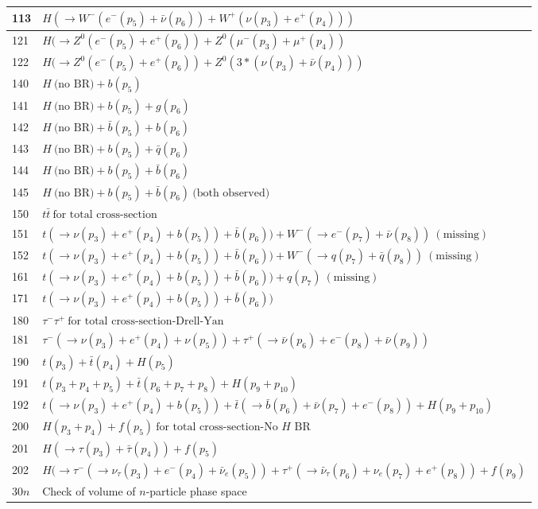\documentclass[12pt]{article}
\begin{document}
\begin{itemize}
\begin{table}
\begin{center}
\begin{tabular}{|l|l|}
113 & $ H(\to W^-(e^-(p_5)+\bar{\nu}(p_6))+W^+(\nu(p_3)+e^+(p_4))) $ \\ 
\hline
121 & $ H(\to Z^0(e^-(p_5)+e^+(p_6))+Z^0(\mu^-(p_3)+\mu^+(p_4)) $ \\ 
122 & $ H(\to Z^0(e^-(p_5)+e^+(p_6))+Z^0(3*(\nu(p_3)+\bar{\nu}(p_4))) $ \\ 
\hline
140 & $ H ~\mbox{(no BR)} + b(p_5)$ \\
141 & $ H ~\mbox{(no BR)} + b(p_5) +g(p_6)$ \\
142 & $ H ~\mbox{(no BR)} + {\bar b}(p_5) +b(p_6)$ \\
143 & $ H ~\mbox{(no BR)} + b(p_5) + {\bar q}(p_6)$ \\
144 & $ H ~\mbox{(no BR)} + b(p_5) + {\bar b}(p_6)$ \\
145 & $ H ~\mbox{(no BR)} + b(p_5) + {\bar b}(p_6) ~\mbox{(both observed)}$ \\
\hline
150 & $ t \bar{t} ~\mbox{for total cross-section} $ \\ 
151 & $ t(\to\nu(p_3)+e^+(p_4)+b(p_5))+\bar{b}(p_6))+W^-(\to e^-(p_7)+\bar{\nu}(p_8))~(\mathrm{missing}) $ \\ 
152 & $ t(\to\nu(p_3)+e^+(p_4)+b(p_5))+\bar{b}(p_6))+W^-(\to q(p_7)+{\bar q}(p_8))~(\mathrm{missing}) $ \\ 
\hline
161 & $ t(\to\nu(p_3)+e^+(p_4)+b(p_5))+\bar{b}(p_6))+q(p_7)~(\mathrm{missing}) $ \\ 
\hline
171 & $ t(\to \nu(p_3)+e^+(p_4)+b(p_5))+\bar{b}(p_6)) $ \\ 
\hline
180 & $ \tau^- \tau^+ ~\mbox{for total cross-section-Drell-Yan} $ \\ 
181 & $ \tau^-(\to \nu(p_3)+e^+(p_4)+\nu(p_5))+\tau^+(\to \bar{\nu}(p_6)+e^-(p_8)+\bar{\nu}(p_9)) $ \\  
\hline
190 & $ t(p_3) + {\bar t}(p_4) + H(p_5) $ \\ 
191 & $ t(p_3+p_4+p_5) + {\bar t}(p_6+p_7+p_8) + H(p_9+p_{10}) $ \\ 
192 & $ t(\to \nu(p_3)+e^+(p_4)+b(p_5)) +
{\bar t}(\to {\bar b}(p_6)+{\bar \nu}(p_7)+e^-(p_8)) + H(p_9+p_{10}) $ \\ 
\hline
200 & $ H(p_3+p_4) + f(p_5) ~\mbox{for total cross-section-No $H$ BR} $ \\ 
201 & $ H(\to \tau(p_3)+{\bar \tau}(p_4)) + f(p_5)$ \\ 
202 & $ H(\to \tau^- (\to \nu_\tau(p_3)+e^-(p_4)+{\bar \nu_e}(p_5))
+\tau^+(\to {\bar \nu_\tau}(p_6)+\nu_e(p_7)+e^+(p_8)) + f(p_9)$ \\ 
\hline
30$n$ &  Check of volume of $n$-particle phase space \\
\hline
\end{tabular}
\end{center}
\end{table}


\end{itemize}
\end{document}
